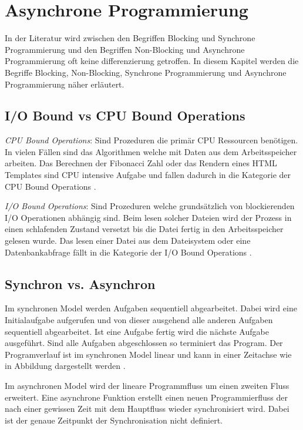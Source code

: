 \section{Asynchrone Programmierung}

In der Literatur wird zwischen den Begriffen Blocking und Synchrone Programmierung und den Begriffen Non-Blocking und Asynchrone Programmierung oft keine differenzierung getroffen. In diesem Kapitel werden die Begriffe Blocking, Non-Blocking, Synchrone Programmierung und Asynchrone Programmierung näher erläutert. 

\subsection{I/O Bound vs CPU Bound Operations}

\emph{CPU Bound Operations}: Sind Prozeduren die primär CPU Ressourcen benötigen. In vielen Fällen sind das Algorithmen welche mit Daten aus dem Arbeitsspeicher arbeiten. Das Berechnen der Fibonacci Zahl oder das Rendern eines HTML Templates sind CPU intensive Aufgabe und fallen dadurch in die Kategorie der CPU Bound Operations \cite[p. 70]{Erb2012}. 

\emph{I/O Bound Operations}: Sind Prozeduren welche grundsätzlich von blockierenden I/O Operationen abhängig sind. Beim lesen solcher Dateien wird der Prozess in einen schlafenden Zustand versetzt bis die Datei fertig in den Arbeitsspeicher gelesen wurde. Das lesen einer Datei aus dem Dateisystem oder eine Datenbankabfrage fällt in die Kategorie der I/O Bound Operations \cite[p. 70]{Erb2012}. 

\subsection{Synchron vs. Asynchron}

Im synchronen Model werden Aufgaben sequentiell abgearbeitet. Dabei wird eine Initialaufgabe aufgerufen und von dieser ausgehend alle anderen Aufgaben sequentiell abgearbeitet. Ist eine Aufgabe fertig wird die nächste Aufgabe ausgeführt. Sind alle Aufgaben abgeschlossen so terminiert das Program. Der Programverlauf ist im synchronen Model linear und kann in einer Zeitachse wie in Abbildung dargestellt werden \cite[]{Pet2015}.

Im asynchronen Model wird der lineare Programmfluss um einen zweiten Fluss erweitert. Eine asynchrone Funktion erstellt einen neuen Programmierfluss der nach einer gewissen Zeit mit dem Hauptfluss wieder synchronisiert wird. Dabei ist der genaue Zeitpunkt der Synchronisation nicht definiert. 

